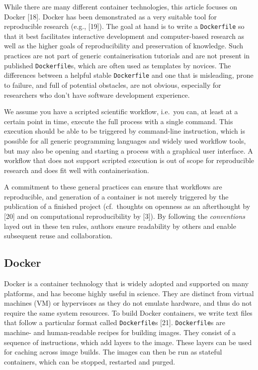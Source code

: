 \documentclass[10pt,letterpaper]{article}
\begin{document}
While there are many different container technologies, this article
focuses on Docker {[}18{]}. Docker has been demonstrated as a very
suitable tool for reproducible research (e.g., {[}19{]}). The goal at
hand is to write a \texttt{Dockerfile} so that it best facilitates
interactive development and computer-based research as well as the
higher goals of reproducibility and preservation of knowledge. Such
practices are not part of generic containerisation tutorials and are not
present in published \texttt{Dockerfile}s, which are often used as
templates by novices. The differences between a helpful stable
\texttt{Dockerfile} and one that is misleading, prone to failure, and
full of potential obstacles, are not obvious, especially for researchers
who don't have software development experience.

We assume you have a scripted scientific workflow, i.e.~you can, at
least at a certain point in time, execute the full process with a single
command. This execution should be able to be triggered by command-line
instruction, which is possible for all generic programming languages and
widely used workflow tools, but may also be opening and starting a
process with a graphical user interface. A workflow that does not
support scripted execution is out of scope for reproducible research and
does fit well with containerisation.

A commitment to these general practices can ensure that workflows are
reproducible, and generation of a container is not merely triggered by
the publication of a finished project (cf.~thoughts on openness as an
afterthought by {[}20{]} and on computational reproducibility by
{[}3{]}). By following the \emph{conventions} layed out in these ten
rules, authors ensure readability by others and enable subsequent reuse
and collaboration.

\hypertarget{docker}{%
\subsection*{Docker}\label{docker}}

Docker is a container technology that is widely adopted and supported on
many platforms, and has become highly useful in science. They are
distinct from virtual machines (VM) or hypervisors as they do not
emulate hardware, and thus do not require the same system resources. To
build Docker containers, we write text files that follow a particular
format called \texttt{Dockerfile}s {[}21{]}. \texttt{Dockerfile}s are
machine- and human-readable recipes for building images. They consist of
a sequence of instructions, which add layers to the image. These layers
can be used for caching across image builds. The images can then be run
as stateful containers, which can be stopped, restarted and purged.
\end{document}
